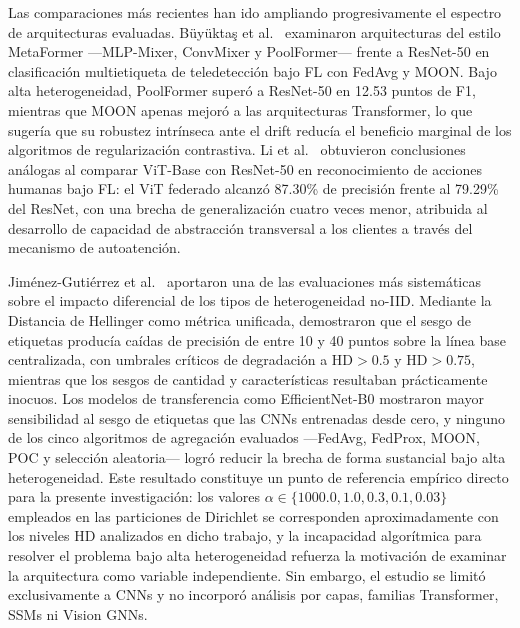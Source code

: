 Las comparaciones más recientes han ido ampliando progresivamente el espectro de arquitecturas
evaluadas.
Büyüktaş et al.\ \cite{buyuktacs2024transformer} examinaron arquitecturas del estilo MetaFormer
---MLP-Mixer, ConvMixer y PoolFormer--- frente a ResNet-50 en clasificación multietiqueta de
teledetección bajo FL con FedAvg y MOON.
Bajo alta heterogeneidad, PoolFormer superó a ResNet-50 en 12.53 puntos de F1, mientras que MOON
apenas mejoró a las arquitecturas Transformer, lo que sugería que su robustez intrínseca ante el
drift reducía el beneficio marginal de los algoritmos de regularización contrastiva.
Li et al.\ \cite{li2025comparison} obtuvieron conclusiones análogas al comparar ViT-Base con
ResNet-50 en reconocimiento de acciones humanas bajo FL: el ViT federado alcanzó 87.30\% de
precisión frente al 79.29\% del ResNet, con una brecha de generalización cuatro veces menor,
atribuida al desarrollo de capacidad de abstracción transversal a los clientes a través del
mecanismo de autoatención.

Jiménez-Gutiérrez et al.\ \cite{jimenez2503thorough} aportaron una de las evaluaciones más
sistemáticas sobre el impacto diferencial de los tipos de heterogeneidad no-IID.
Mediante la Distancia de Hellinger como métrica unificada, demostraron que el sesgo de etiquetas
producía caídas de precisión de entre 10 y 40 puntos sobre la línea base centralizada, con umbrales
críticos de degradación a $\text{HD} > 0.5$ y $\text{HD} > 0.75$, mientras que los sesgos de
cantidad y características resultaban prácticamente inocuos.
Los modelos de transferencia como EfficientNet-B0 mostraron mayor sensibilidad al sesgo de etiquetas
que las CNNs entrenadas desde cero, y ninguno de los cinco algoritmos de agregación evaluados
---FedAvg, FedProx, MOON, POC y selección aleatoria--- logró reducir la brecha de forma sustancial
bajo alta heterogeneidad.
Este resultado constituye un punto de referencia empírico directo para la presente investigación:
los valores $\alpha \in \{1000.0, 1.0, 0.3, 0.1, 0.03\}$ empleados en las particiones de Dirichlet
se corresponden aproximadamente con los niveles HD analizados en dicho trabajo, y la incapacidad
algorítmica para resolver el problema bajo alta heterogeneidad refuerza la motivación de examinar
la arquitectura como variable independiente.
Sin embargo, el estudio se limitó exclusivamente a CNNs y no incorporó análisis por capas,
familias Transformer, SSMs ni Vision GNNs.

